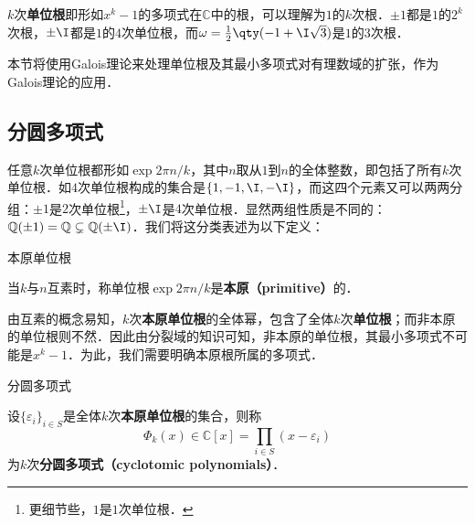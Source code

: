 



$k$次\textbf{单位根}即形如$x^k-1$的多项式在$\mathbb{C}$中的根，可以理解为$1$的$k$次根．$\pm 1$都是$1$的$2^k$次根，$\pm \I$都是$1$的$4$次单位根，而$\omega=\frac{1}{2}\qty(-1+\I\sqrt{3})$是$1$的$3$次根．

本节将使用Galois理论来处理单位根及其最小多项式对有理数域的扩张，作为Galois理论的应用．


\subsection{分圆多项式}

任意$k$次单位根都形如$\exp{2\pi n/k}$，其中$n$取从$1$到$n$的全体整数，即包括了所有$k$次单位根．如$4$次单位根构成的集合是$\{1, -1, \I, -\I\}$，而这四个元素又可以两两分组：$\pm 1$是$2$次单位根\footnote{更细节些，$1$是$1$次单位根．}，$\pm \I$是$4$次单位根．显然两组性质是不同的：$\mathbb{Q}(\pm 1)=\mathbb{Q}\subsetneq \mathbb{Q}(\pm\I)$．我们将这分类表述为以下定义：

\begin{definition}{本原单位根}

当$k$与$n$互素时，称单位根$\exp{2\pi n/k}$是\textbf{本原（primitive）}的．

\end{definition}

由互素的概念易知，$k$次\textbf{本原单位根}的全体幂，包含了全体$k$次\textbf{单位根}；而非本原的单位根则不然．因此由分裂域的知识可知，非本原的单位根，其最小多项式不可能是$x^k-1$．为此，我们需要明确本原根所属的多项式．

\begin{definition}{分圆多项式}

设$\{\varepsilon_i\}_{i\in S}$是全体$k$次\textbf{本原单位根}的集合，则称
\begin{equation}
\Phi_k(x)\in \mathbb{C}[x] = \prod_{i\in S}(x-\varepsilon_i)
\end{equation}
为$k$次\textbf{分圆多项式（cyclotomic polynomials）}．

\end{definition}




